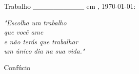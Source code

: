 \documentclass[
12pt,				%
openright,			%
oneside,			%
a4paper,			%
english,			%
french,				%
spanish,			%
brazil				%
]{abntex2}
\begin{document}
\begin{folhadeaprovacao}

  \begin{center}
    {\ABNTEXchapterfont\large\imprimirautor}

    \vspace*{\fill}\vspace*{\fill}
    \begin{center}
      \ABNTEXchapterfont\bfseries\Large\imprimirtitulo
    \end{center}
    \vspace*{\fill}
    
    \hspace{.45\textwidth}
    \begin{minipage}{.5\textwidth}
        \imprimirpreambulo
    \end{minipage}%
    \vspace*{\fill}
  \end{center}
        
	Trabalho \_\_\_\_\_\_\_\_\_\_ em \imprimirlocal, \today:
	
      
  \begin{center}
    \vspace*{0.5cm}
    {\large\imprimirlocal}
    \par
    {\large\imprimirdata}
    \vspace*{1cm}
  \end{center}
  
\end{folhadeaprovacao}


\begin{agradecimentos}
\end{agradecimentos}


\newpage
\begin{epigrafe}
    \vspace*{\fill}
	\begin{flushright}
		\textit{"Escolha um trabalho
		\\que você ame
		\\e não terás que trabalhar
		\\um único dia na sua vida."}

Confúcio
	\end{flushright}
\end{epigrafe}
\end{document}

